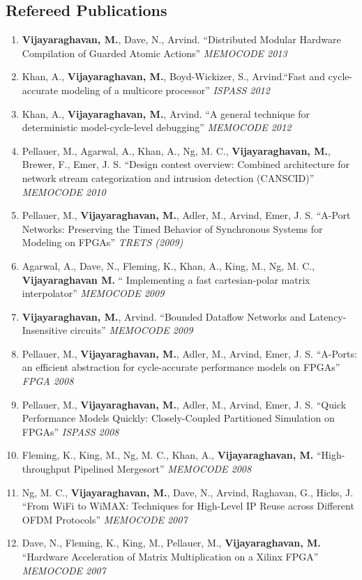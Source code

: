 \documentclass[margin,line]{resume}
\begin{document}
\begin{resume}
    \section{\mysidestyle Refereed Publications}
    \begin{enumerate}
    \item \textbf{Vijayaraghavan, M.}, Dave, N., Arvind.
    ``Distributed Modular Hardware Compilation of Guarded Atomic Actions'' \textit{MEMOCODE 2013}
    \item Khan, A., \textbf{Vijayaraghavan, M.}, Boyd-Wickizer, S., Arvind.``Fast and cycle-accurate modeling of 
    a multicore processor''
    \textit {ISPASS 2012}
    \item Khan, A., \textbf{Vijayaraghavan, M.}, Arvind. ``A general technique for deterministic model-cycle-level debugging''
    \textit{MEMOCODE 2012}
    \item Pellauer, M., Agarwal, A., Khan, A., Ng, M. C., \textbf{Vijayaraghavan, M.}, Brewer, F., Emer, J. S. 
    ``Design contest overview: Combined architecture for network stream categorization and intrusion detection (CANSCID)''
    \textit{MEMOCODE 2010}
    \item Pellauer, M., \textbf{Vijayaraghavan, M.}, Adler, M., Arvind, Emer, J. S.
    ``A-Port Networks: Preserving the Timed Behavior of Synchronous Systems for
    Modeling on FPGAs'' \textit{TRETS (2009)}
    \item Agarwal, A., Dave, N., Fleming, K., Khan, A., King, M., Ng, M. C., \textbf{Vijayaraghavan M.} ``
    Implementing a fast cartesian-polar matrix interpolator'' \textit{MEMOCODE 2009}
    \item \textbf{Vijayaraghavan, M.}, Arvind. ``Bounded Dataflow Networks and
    Latency-Insensitive circuits'' \textit{MEMOCODE 2009}
    \item Pellauer, M.,
    \textbf{Vijayaraghavan, M.}, Adler, M., Arvind, Emer, J. S. ``A-Ports: an
    efficient abstraction for cycle-accurate performance models on FPGAs''
    \textit{FPGA 2008}
    \item Pellauer, M., \textbf{Vijayaraghavan, M.}, Adler, M., Arvind, Emer,
    J. S. ``Quick Performance Models Quickly: Closely-Coupled Partitioned
    Simulation on FPGAs'' \textit{ISPASS 2008}
    \item Fleming, K., King, M., Ng, M. C., Khan, A., \textbf{Vijayaraghavan, M.} ``High-throughput Pipelined Mergesort'' \textit{MEMOCODE 2008}
    \item Ng, M. C., \textbf{Vijayaraghavan, M.}, Dave, N., Arvind, Raghavan, G., Hicks, J. ``From WiFi to WiMAX: Techniques for High-Level IP Reuse across Different OFDM Protocols'' \textit{MEMOCODE 2007}
    \item Dave, N., Fleming, K., King, M., Pellauer, M., \textbf{Vijayaraghavan, M.} ``Hardware Acceleration of Matrix Multiplication on a Xilinx FPGA'' \textit{MEMOCODE 2007}
    \end{enumerate}


\end{resume}
\end{document}
